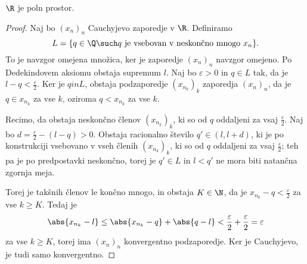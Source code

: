 
\begin{izrek}
  $\R$ je poln prostor.
\end{izrek}

\begin{proof}
  Naj bo $(x_n)_n$ Cauchyjevo zaporedje v $\R$.
  Definiramo
  \[
	L = \{ q \in \Q \such \text{$q$ je vsebovan v neskončno mnogo $x_n$} \}.
  \]
  To je navzgor omejena množica, ker je zaporedje $(x_n)_n$ navzgor omejeno.
  Po Dedekindovem aksiomu obstaja supremum $l$.
  Naj bo $\varepsilon > 0$ in $q \in L$ tak, da je $l - q <
  \frac{\varepsilon}{2}$.
  Ker je $q in L$, obstaja podzaporedje $(x_{n_k})_k$ zaporedja $(x_n)_n$, da je
  $q \in x_{n_k}$ za vse $k$, oziroma $q < x_{n_k}$ za vse $k$.

  Recimo, da obstaja neskončno členov $(x_{n_k})_k$, ki so od $q$ oddaljeni za
  vsaj $\frac{\varepsilon}{2}$.
  Naj bo $d = \frac{\varepsilon}{2} - (l - q) > 0$.
  Obstaja racionalno število $q' \in (l, l+d)$, ki je po konstrukciji vsebovano
  v vseh členih $(x_{n_k})_k$, ki so od $q$ oddaljeni za vsaj
  $\frac{\varepsilon}{2}$; teh pa je po predpostavki neskončno, torej je $q' \in
  L$ in $l < q'$ ne mora biti natančna zgornja meja.
  \protislovje{}

  Torej je takšnih členov le končno mnogo, in obstaja $K \in \N$, da je $x_{n_k}
  - q < \frac{\varepsilon}{2}$ za vse $k \ge K$.
  Tedaj je
  \[
	\abs{x_{n_k} - l} \le \abs{x_{n_k} - q} + \abs{q - l}
	< \frac{\varepsilon}{2} + \frac{\varepsilon}{2}
	= \varepsilon
  \]
  za vse $k \ge K$, torej ima $(x_n)_n$ konvergentno podzaporedje.
  Ker je Cauchyjevo, je tudi samo konvergentno.
\end{proof}


